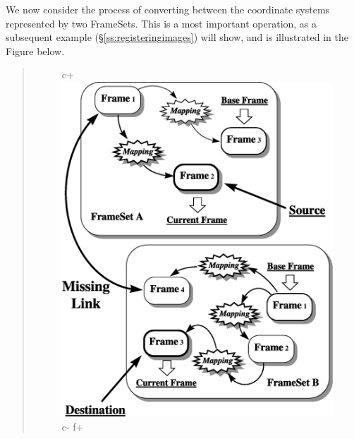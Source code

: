 \documentclass[twoside,11pt]{article}
\newcommand{\secref}[1]{\S\ref{#1}}
\newcommand{\secref}[1]{\ref{#1}}
\begin{document}
\begin{htmlonly}
   We now consider the process of converting between the coordinate
   systems represented by two FrameSets. This is a most important
   operation, as a subsequent example (\secref{ss:registeringimages})
   will show, and is illustrated in the Figure below.
   \begin{quote}
   \begin{figure}
   \label{fig:fsconvert}
c+
   \includegraphics[scale=1.0]{sun211_figures/fsalign.eps}
c-
f+

\end{figure}
\end{quote}
\end{htmlonly}
\end{document}
